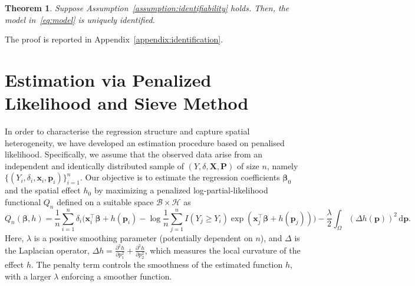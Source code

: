 \documentclass[11pt]{article}
\newtheorem{theorem}{Theorem}
\begin{document}
\begin{theorem}
	\label{theo:identification}
Suppose Assumption~\ref{assumption:identifiability} holds. Then, the model in~\eqref{eq:model} is uniquely identified.
\end{theorem}
	The proof is reported in Appendix~\ref{appendix:identification}.

 \section{Estimation via Penalized Likelihood and Sieve Method}\label{sec:estimation}
In order to characterise the regression structure and capture spatial heterogeneity, we have developed an estimation procedure based on penalised likelihood. Specifically, we assume that the observed data arise from an independent and identically distributed sample of $(Y, \delta, \bm X, \bm P)$ of size $n$, namely 
\(
\{(Y_i, \delta_i, \bm{x}_i, \mathbf{p}_i)\}_{i=1}^n.
\)  
Our objective is to estimate the regression coefficients \(\boldsymbol{\beta}_0\) and the spatial effect \(h_0\) by maximizing a penalized log-partial-likelihood functional $Q_n$ defined on a suitable space $\mathcal{B}\times\mathcal{H}$ as
	\begin{equation}\label{eq:penalized_likelihood}
		Q_n(\bm \beta, h) = \frac{1}{n} \sum_{i=1}^n \delta_i \Big(\bm{x}_i^\top \bm{\beta} + h(\bm{p}_i) - \log \frac{1}{n} \sum_{j=1}^n I(Y_j \ge Y_i) \exp (\bm{x}_j^\top \bm{\beta} + h(\bm{p}_j) ) \Big) - \frac{\lambda}{2} \int_{\Omega} (\Delta h(\bm p))^2 \,\text{d}\bm p.
	\end{equation}
	Here, $\lambda$ is a positive smoothing parameter (potentially dependent on $n$), and $\Delta$ is the Laplacian operator, $\Delta h = \frac{\partial^2 h}{\partial p_1^2} + \frac{\partial^2 h}{\partial p_2^2}$, which measures the local curvature of the effect $h$. The penalty term controls the smoothness of the estimated function $h$, with a larger $\lambda$ enforcing a smoother function.
	
\end{document}
